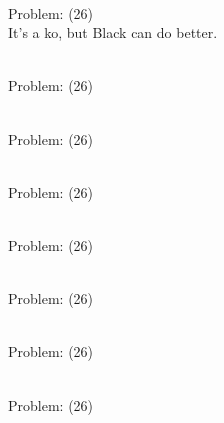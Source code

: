 \documentclass[11pt]{article}
\begin{document}
\begin{minipage}[t]{0.5\textwidth}
  {\centering
  
\\
Problem: (26)\\
It's a ko, but Black can do better.\\
  }
\end{minipage}
\begin{minipage}[t]{0.5\textwidth}
  {\centering
  
\\
Problem: (26)\\
  }
\end{minipage}
\begin{minipage}[t]{0.5\textwidth}
  {\centering
  
\\
Problem: (26)\\
  }
\end{minipage}
\begin{minipage}[t]{0.5\textwidth}
  {\centering
  
\\
Problem: (26)\\
  }
\end{minipage}
\begin{minipage}[t]{0.5\textwidth}
  {\centering
  
\\
Problem: (26)\\
  }
\end{minipage}
\begin{minipage}[t]{0.5\textwidth}
  {\centering
  
\\
Problem: (26)\\
  }
\end{minipage}
\begin{minipage}[t]{0.5\textwidth}
  {\centering
  
\\
Problem: (26)\\
  }
\end{minipage}
\begin{minipage}[t]{0.5\textwidth}
  {\centering
  
\\
Problem: (26)\\
  }
\end{minipage}
\end{document}
